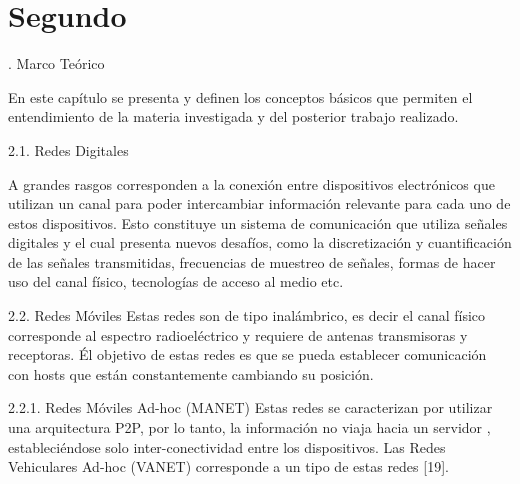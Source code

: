 \chapter{Segundo}
.	Marco Teórico

En este capítulo se presenta y definen los conceptos básicos que permiten el entendimiento de la materia investigada y del posterior trabajo realizado.

2.1.	Redes Digitales

A grandes rasgos corresponden  a la conexión  entre dispositivos electrónicos que utilizan un canal para poder intercambiar información relevante para cada uno de estos dispositivos. Esto constituye un sistema de comunicación que utiliza señales digitales y el cual presenta nuevos desafíos, como la discretización y cuantificación de las señales transmitidas, frecuencias de muestreo de señales, formas de hacer uso del canal físico, tecnologías de acceso al medio etc. 

2.2.	Redes Móviles
Estas redes son de tipo inalámbrico, es decir el canal físico corresponde al espectro radioeléctrico y requiere de antenas transmisoras y receptoras. Él objetivo de estas redes es que se pueda establecer comunicación con hosts que están constantemente cambiando su posición. 

2.2.1.	Redes Móviles Ad-hoc (MANET)
Estas redes se caracterizan por utilizar una arquitectura P2P, por  lo tanto, la información no viaja hacia un servidor , estableciéndose solo inter-conectividad entre los dispositivos. Las Redes Vehiculares Ad-hoc (VANET) corresponde a un tipo de estas redes  [19].

